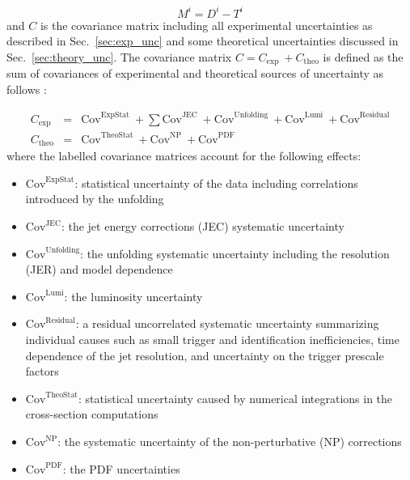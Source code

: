\begin{equation}
 \label{eqn:M_matrix}
 M^{i}=D^{i}-T^{i}
\end{equation}
and $C$ is the covariance matrix including all experimental uncertainties as described in Sec.~\ref{sec:exp_unc} and some theoretical uncertainties discussed in Sec.~\ref{sec:theory_unc}. The covariance matrix $C=C_\mathrm{exp}~\plus C_\mathrm{theo}$ is defined as the sum of covariances of experimental and theoretical sources of uncertainty as follows : 

\begin{eqnarray}
 \label{eqn:c_exp}
 C_\mathrm{exp} &=& \mathrm{Cov}^\mathrm{ExpStat}~\plus \sum\mathrm{Cov}^\mathrm{JEC}~\plus \mathrm{Cov}^\mathrm{Unfolding}~\plus \mathrm{Cov}^\mathrm{Lumi}~\plus \mathrm{Cov}^\mathrm{Residual}\\
 C_\mathrm{theo} &=& \mathrm{Cov}^\mathrm{TheoStat}~\plus \mathrm{Cov}^\mathrm{NP}~\plus \mathrm{Cov}^\mathrm{PDF}
 \label{eqn:c_theo}
\end{eqnarray}
where the labelled covariance matrices account for the following effects:

\begin{itemize}
\item{$\mathrm{Cov}^\mathrm{ExpStat}$: statistical uncertainty of the data including correlations introduced by the unfolding}
\item{$\mathrm{Cov}^\mathrm{JEC}$: the jet energy corrections (JEC) systematic uncertainty}
\item{$\mathrm{Cov}^\mathrm{Unfolding}$: the unfolding systematic uncertainty including the resolution (JER) and model dependence}
\item{$\mathrm{Cov}^\mathrm{Lumi}$: the luminosity uncertainty}
\item{$\mathrm{Cov}^\mathrm{Residual}$: a residual uncorrelated systematic uncertainty summarizing individual causes such as small trigger and identification inefficiencies, time dependence of the jet \pt resolution, and uncertainty on the trigger prescale factors}
\item{$\mathrm{Cov}^\mathrm{TheoStat}$: statistical uncertainty caused by numerical integrations in the cross-section computations}
\item{$\mathrm{Cov}^\mathrm{NP}$: the systematic uncertainty of the non-perturbative (NP) corrections}
\item{$\mathrm{Cov}^\mathrm{PDF}$: the PDF uncertainties}
\end{itemize}

